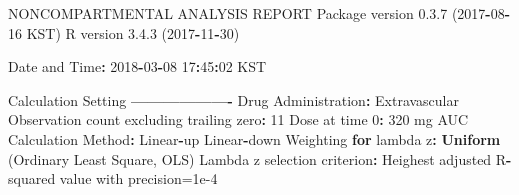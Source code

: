 \documentclass[12pt,]{krantz}
\newenvironment{Shaded}{\begin{snugshade}}{\end{snugshade}}
\newcommand{\KeywordTok}[1]{\textcolor[rgb]{0.13,0.29,0.53}{\textbf{#1}}}
\newcommand{\DecValTok}[1]{\textcolor[rgb]{0.00,0.00,0.81}{#1}}
\newcommand{\FloatTok}[1]{\textcolor[rgb]{0.00,0.00,0.81}{#1}}
\newcommand{\StringTok}[1]{\textcolor[rgb]{0.31,0.60,0.02}{#1}}
\newcommand{\ControlFlowTok}[1]{\textcolor[rgb]{0.13,0.29,0.53}{\textbf{#1}}}
\newcommand{\OperatorTok}[1]{\textcolor[rgb]{0.81,0.36,0.00}{\textbf{#1}}}
\newcommand{\NormalTok}[1]{#1}
\theoremstyle{definition}
\theoremstyle{definition}
\theoremstyle{definition}
\theoremstyle{remark}
\begin{document}
\begin{Shaded}
\begin{Highlighting}[]
\NormalTok{                        NONCOMPARTMENTAL ANALYSIS REPORT}
\NormalTok{                       Package version }\FloatTok{0.3}\NormalTok{.}\DecValTok{7}\NormalTok{ (}\DecValTok{2017}\OperatorTok{-}\DecValTok{08}\OperatorTok{-}\DecValTok{16}\NormalTok{ KST)}
\NormalTok{                          R version }\FloatTok{3.4}\NormalTok{.}\DecValTok{3}\NormalTok{ (}\DecValTok{2017}\OperatorTok{-}\DecValTok{11}\OperatorTok{-}\DecValTok{30}\NormalTok{)}

\NormalTok{Date and Time}\OperatorTok{:}\StringTok{ }\DecValTok{2018}\OperatorTok{-}\DecValTok{03}\OperatorTok{-}\DecValTok{08} \DecValTok{17}\OperatorTok{:}\DecValTok{45}\OperatorTok{:}\DecValTok{02}\NormalTok{ KST}

\NormalTok{Calculation Setting}
\OperatorTok{-------------------}
\NormalTok{Drug Administration}\OperatorTok{:}\StringTok{ }\NormalTok{Extravascular}
\NormalTok{Observation count excluding trailing zero}\OperatorTok{:}\StringTok{ }\DecValTok{11}
\NormalTok{Dose at time }\DecValTok{0}\OperatorTok{:}\StringTok{ }\DecValTok{320}\NormalTok{ mg}
\NormalTok{AUC Calculation Method}\OperatorTok{:}\StringTok{ }\NormalTok{Linear}\OperatorTok{-}\NormalTok{up Linear}\OperatorTok{-}\NormalTok{down}
\NormalTok{Weighting }\ControlFlowTok{for}\NormalTok{ lambda z}\OperatorTok{:}\StringTok{ }\KeywordTok{Uniform}\NormalTok{ (Ordinary Least Square, OLS)}
\NormalTok{Lambda z selection criterion}\OperatorTok{:}\StringTok{ }\NormalTok{Heighest adjusted R}\OperatorTok{-}\NormalTok{squared value with precision=}\FloatTok{1e-4}



\end{Highlighting}
\end{Shaded}
\end{document}
